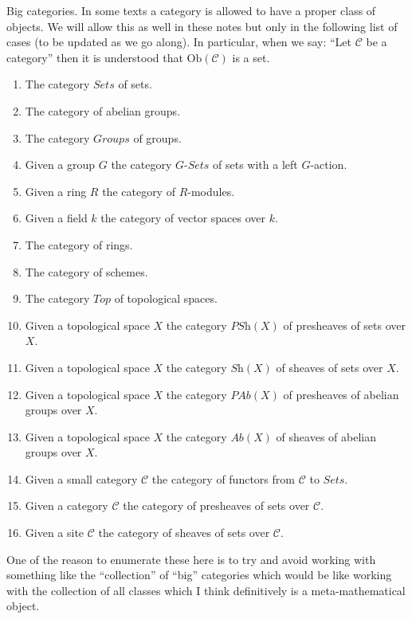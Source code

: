 \begin{remark}
\label{remark-big-categories}
Big categories. In some texts a category is allowed to have a proper
class of objects. We will allow this as well in these notes but only
in the following list of cases (to be updated as we go along).
In particular, when we say: ``Let $\mathcal{C}$ be a category''
then it is understood that $\text{Ob}(\mathcal{C})$ is a set.
\begin{enumerate}
\item The category $\textit{Sets}$ of sets.
\item The category of abelian groups.
\item The category $\textit{Groups}$ of groups.
\item Given a group $G$ the category $G\textit{-Sets}$ of
sets with a left $G$-action.
\item Given a ring $R$ the category of $R$-modules.
\item Given a field $k$ the category of vector spaces over $k$.
\item The category of rings.
\item The category of schemes.
\item The category $\textit{Top}$ of topological spaces.
\item Given a topological space $X$ the category
$\textit{PSh}(X)$ of presheaves of sets over $X$.
\item Given a topological space $X$ the category
$\textit{Sh}(X)$ of sheaves of sets over $X$.
\item Given a topological space $X$ the category
$\textit{PAb}(X)$ of presheaves of abelian groups over $X$.
\item Given a topological space $X$ the category
$\textit{Ab}(X)$ of sheaves of abelian groups over $X$.
\item Given a small category $\mathcal{C}$ the category of functors
from $\mathcal{C}$ to $\textit{Sets}$.
\item Given a category $\mathcal{C}$ the category of presheaves of sets
over $\mathcal{C}$.
\item Given a site $\mathcal{C}$ the category of sheaves
of sets over $\mathcal{C}$.
\end{enumerate}
One of the reason to enumerate these here is to try and avoid 
working with something like the ``collection'' of ``big'' categories
which would be like working with the collection of all classes
which I think definitively is a meta-mathematical object.
\end{remark}

